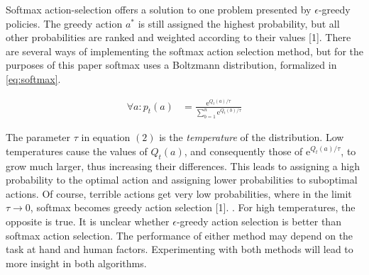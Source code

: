 \documentclass{article}
\begin{document}
Softmax action-selection offers a solution to one problem presented by $\epsilon$-greedy policies. The greedy action $a^*$ is still assigned the highest probability, but all other probabilities are ranked and weighted according to their values [1]. There are several ways of implementing the softmax action selection method, but for the purposes of this paper softmax uses a Boltzmann distribution, formalized in \ref{eq:softmax}.
\begin{mdframed}
\begin{align}
\forall a: p_t(a) &= \frac{\text{e}^{Q_t(a)/\tau}}{\sum^n_{b=1}\text{e}^{Q_t(b)/\tau}} \label{eq:softmax}
\end{align}
\end{mdframed}
The parameter $\tau$ in equation $(2)$ is the \textit{temperature} of the distribution. Low temperatures cause the values of $Q_t(a)$, and consequently those of e$^{Q_t(a)/\tau}$, to grow much larger, thus increasing their differences. This leads to assigning a high probability to the optimal action and assigning lower probabilities to suboptimal actions. Of course, terrible actions get very low probabilities, where in the limit $\tau\rightarrow0$, softmax becomes greedy action selection [1].
. For high temperatures, the opposite is true.
It is unclear whether $\epsilon$-greedy action selection is better than softmax action selection. The performance of either method may depend on the task at hand and human factors. Experimenting with both methods will lead to more insight in both algorithms.
\pagebreak
\end{document}
